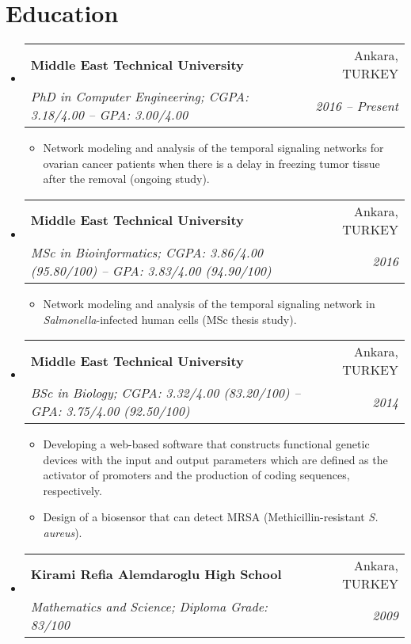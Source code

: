 \documentclass[a4paper,12pt]{article}
\makeatletter
\newcommand{\resumeSubHeading}[4]{
  \vspace{-1pt}\item
    \begin{tabular*}{0.97\textwidth}{l@{\extracolsep{\fill}}r}
      \textbf{#1} & #2 \\
      \textit{\small#3} & \textit{\small #4} \\
    \end{tabular*}\vspace{-5pt}
}
\newcommand{\resumeItemNoTitle}[1]{
  \item\small{
    {#1\vspace{-2pt}}
  }
}
\newcommand{\resumeSubHeadingListStart}{\begin{itemize}[leftmargin=*]}
\newcommand{\resumeSubHeadingListEnd}{\end{itemize}}
\newcommand{\resumeItemListStart}{\begin{itemize}}
\newcommand{\resumeItemListEnd}{\end{itemize}\vspace{-5pt}}
\makeatother
\begin{document}
\section{Education}
  \resumeSubHeadingListStart
    \resumeSubHeading
      {Middle East Technical University}{Ankara, TURKEY}
      {PhD in Computer Engineering; CGPA: 3.18/4.00 -- GPA: 3.00/4.00}{2016 -- Present}
      \resumeItemListStart
        \resumeItemNoTitle{Network modeling and analysis of the temporal signaling networks for ovarian cancer patients when there is a delay in freezing tumor tissue after the removal (ongoing study).}
      \resumeItemListEnd
    \resumeSubHeading
      {Middle East Technical University}{Ankara, TURKEY}
      {MSc in Bioinformatics; CGPA: 3.86/4.00 (95.80/100) -- GPA: 3.83/4.00 (94.90/100)}{2016}
      \resumeItemListStart
        \resumeItemNoTitle{Network modeling and analysis of the temporal signaling network in \textit{Salmonella}-infected human cells (MSc thesis study).}
      \resumeItemListEnd
    \resumeSubHeading
      {Middle East Technical University}{Ankara, TURKEY}
      {BSc in Biology; CGPA: 3.32/4.00 (83.20/100) -- GPA: 3.75/4.00 (92.50/100)}{2014}
      \resumeItemListStart
        \resumeItemNoTitle{Developing a web-based software that constructs functional genetic devices with the input and output parameters which are defined as the activator of promoters and the production of coding sequences, respectively.}
        \resumeItemNoTitle{Design of a biosensor that can detect MRSA (Methicillin-resistant \textit{S. aureus}).}
      \resumeItemListEnd
    \resumeSubHeading
      {Kirami Refia Alemdaroglu High School}{Ankara, TURKEY}
      {Mathematics and Science; Diploma Grade: 83/100}{2009}
  \resumeSubHeadingListEnd

\end{document}
